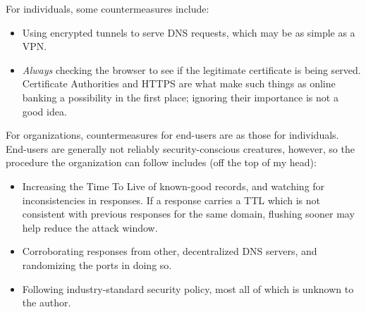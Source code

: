 \documentclass{article}
\begin{document}
	For individuals, some countermeasures include:

	\begin{itemize}
		\item Using encrypted tunnels to serve DNS requests, which may
			be as simple as a VPN.
		\item {\em Always} checking the browser to see if the
			legitimate certificate is being served. Certificate
			Authorities and HTTPS are what make such things as
			online banking a possibility in the first place;
			ignoring their importance is not a good idea.
	\end{itemize}

	For organizations, countermeasures for end-users are as those for
	individuals. End-users are generally not reliably security-conscious
	creatures, however, so the procedure the organization can follow
	includes (off the top of my head):

	\begin{itemize}
		\item Increasing the Time To Live of known-good records, and
			watching for inconsistencies in responses. If a
			response carries a TTL which is not consistent with
			previous responses for the same domain, flushing sooner
			may help reduce the attack window.
		\item Corroborating responses from other, decentralized DNS
			servers, and randomizing the ports in doing so.
		\item Following industry-standard security policy, most all of
			which is unknown to the author.
	\end{itemize}
\end{document}
